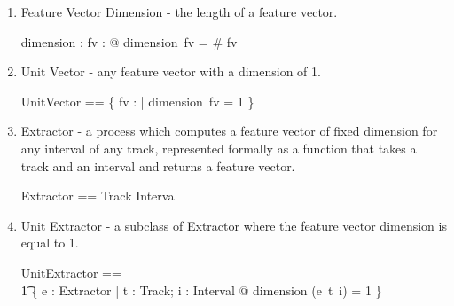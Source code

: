 \documentclass[11pt]{article}
\begin{document}
\begin{enumerate}
\newcommand{\Vdsl}{\mathrel{~FV^{d * sl}}}


\newcommand{\Vd}{\mathrel{~FV^{d}}}


\newcommand{\Z}{\mathrel{~FV^{1}}}


\newcommand{\Vsl}{\mathrel{~FV^{sl}}}



\item \textsf{Feature Vector Dimension} - the length of a feature vector. 

\begin{axdef}
	dimension : \FV \fun \nat
\where
	\forall fv : \FV @ dimension~fv = \# fv
\end{axdef}

\item \textsf{Unit Vector} - any feature vector with a dimension of 1.

\begin{zed}
	UnitVector == \{ fv : \FV | dimension~fv = 1 \}
\end{zed}

\item \textsf{Extractor} - a  process which computes a feature vector of fixed dimension for any interval of any track, represented formally as a function that takes a track and an interval and returns a feature vector.

\begin{zed}
	Extractor ==  Track \fun Interval \fun \FV 
\end{zed}

\item \textsf{Unit Extractor} - a subclass of Extractor where the feature vector dimension is equal to 1.

\begin{zed}
	UnitExtractor ==  \\
\t1		\{ e : Extractor | \forall t : Track; i : Interval @ dimension (e~t~i) = 1 \}  
\end{zed}


\end{enumerate}
\end{document}
